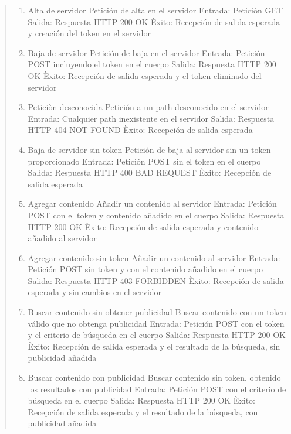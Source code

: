 \documentclass[DIV=calc,paper=a4,fontsize=11pt,onecolumn]{scrartcl}	 %
\newcommand{\hint}[1]{\begin{quote}\itshape #1 \end{quote}}
\begin{document}
\hint{
		\begin{enumerate}
			\item Alta de servidor
			\subitem Petición de alta en el servidor
			\subitem Entrada: Petición GET
			\subitem Salida: Respuesta HTTP 200 OK
			\subitem Èxito: Recepción de salida esperada y creación del token en el servidor
			
			\item Baja de servidor
			\subitem Petición de baja en el servidor
			\subitem Entrada: Petición POST incluyendo el token en el cuerpo
			\subitem Salida: Respuesta HTTP 200 OK
			\subitem Èxito: Recepción de salida esperada y el token eliminado del servidor
			
			\item Peticiòn desconocida
			\subitem Petición a un path desconocido en el servidor
			\subitem Entrada: Cualquier path inexistente en el servidor
			\subitem Salida: Respuesta HTTP 404 NOT FOUND
			\subitem Èxito: Recepción de salida esperada
		
			\item Baja de servidor sin token
			\subitem Petición de baja al servidor sin un token proporcionado
			\subitem Entrada: Petición POST sin el token en el cuerpo
			\subitem Salida: Respuesta HTTP 400 BAD REQUEST
			\subitem Èxito: Recepción de salida esperada
			
			\item Agregar contenido
			\subitem Añadir un contenido al servidor
			\subitem Entrada: Petición POST con el token y contenido añadido en el cuerpo
			\subitem Salida: Respuesta HTTP 200 OK
			\subitem Èxito: Recepción de salida esperada y contenido añadido al servidor
			
			\item Agregar contenido sin token
			\subitem Añadir un contenido al servidor
			\subitem Entrada: Petición POST sin token y con el contenido añadido en el cuerpo
			\subitem Salida: Respuesta HTTP 403 FORBIDDEN
			\subitem Èxito: Recepción de salida esperada y sin cambios en el servidor
			
			\item Buscar contenido sin obtener publicidad
			\subitem Buscar contenido con un token válido que no obtenga publicidad
			\subitem Entrada: Petición POST con el token y el criterio de búsqueda en el cuerpo
			\subitem Salida: Respuesta HTTP 200 OK
			\subitem Èxito: Recepción de salida esperada y el resultado de la búsqueda, sin publicidad añadida
			
			\item Buscar contenido con publicidad
			\subitem Buscar contenido sin token, obtenido los resultados con publicidad
			\subitem Entrada: Petición POST con el criterio de búsqueda en el cuerpo
			\subitem Salida: Respuesta HTTP 200 OK
			\subitem Èxito: Recepción de salida esperada y el resultado de la búsqueda, con publicidad añadida
			

\end{enumerate}}
\end{document}
